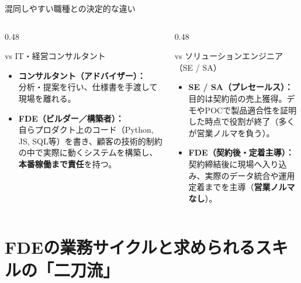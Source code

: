 \documentclass[aspectratio=169,11pt]{beamer}
\begin{document}
\begin{frame}{混同しやすい職種との決定的な違い}
  \begin{columns}[T]
    \begin{column}{0.48\textwidth}
      \begin{block}{vs IT・経営コンサルタント}
        \small
        \begin{itemize}
          \item \textbf{コンサルタント（アドバイザー）：}\\
            分析・提案を行い、仕様書を手渡して現場を離れる。
          \vspace{0.5em}
          \item \textbf{FDE（ビルダー／構築者）：}\\
            自らプロダクト上のコード（Python, JS, SQL等）を書き、顧客の技術的制約の中で実際に動くシステムを構築し、\textbf{本番稼働まで責任}を持つ。
        \end{itemize}
      \end{block}
    \end{column}
    \begin{column}{0.48\textwidth}
      \begin{block}{vs ソリューションエンジニア（SE / SA）}
        \small
        \begin{itemize}
          \item \textbf{SE / SA（プレセールス）：}\\
            目的は契約前の売上獲得。デモやPOCで製品適合性を証明した時点で役割が終了（多くが営業ノルマを負う）。
          \vspace{0.5em}
          \item \textbf{FDE（契約後・定着主導）：}\\
            契約締結後に現場へ入り込み、実際のデータ統合や運用定着までを主導（\textbf{営業ノルマなし}）。
        \end{itemize}
      \end{block}
    \end{column}
  \end{columns}
\end{frame}

\section{FDEの業務サイクルと求められるスキルの「二刀流」}
\end{document}
